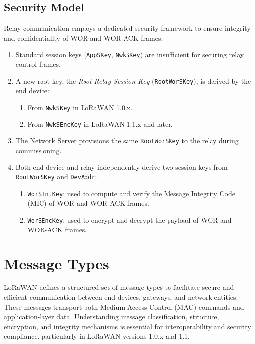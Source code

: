 \subsection{Security Model}

Relay communication employs a dedicated security framework to ensure integrity and confidentiality of WOR and WOR-ACK frames:

\begin{enumerate}
    \item Standard session keys (\texttt{AppSKey}, \texttt{NwkSKey}) are insufficient for securing relay control frames.

    \item A new root key, the \emph{Root Relay Session Key} (\texttt{RootWorSKey}), is derived by the end device:
          \begin{enumerate}
              \item From \texttt{NwkSKey} in LoRaWAN 1.0.x.
              \item From \texttt{NwkSEncKey} in LoRaWAN 1.1.x and later.
          \end{enumerate}

    \item The Network Server provisions the same \texttt{RootWorSKey} to the relay during commissioning.

    \item Both end device and relay independently derive two session keys from \texttt{RootWorSKey} and \texttt{DevAddr}:
          \begin{enumerate}
              \item \texttt{WorSIntKey}: used to compute and verify the Message Integrity Code (MIC) of WOR and WOR-ACK frames.
              \item \texttt{WorSEncKey}: used to encrypt and decrypt the payload of WOR and WOR-ACK frames.
          \end{enumerate}
\end{enumerate}

\section{Message Types}

LoRaWAN defines a structured set of message types to facilitate secure and efficient communication between end devices, gateways, and network entities. These messages transport both Medium Access Control (MAC) commands and application-layer data. Understanding message classification, structure, encryption, and integrity mechanisms is essential for interoperability and security compliance, particularly in LoRaWAN versions 1.0.x and 1.1.

